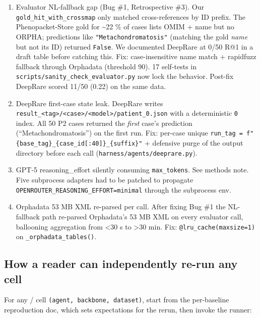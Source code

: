 \begin{enumerate}
\def\labelenumi{\arabic{enumi}.}
\item
  Evaluator NL-fallback gap (Bug \#1, Retrospective \#3). Our
  \texttt{gold\_hit\_with\_crossmap} only matched cross-references by ID prefix.
  The Phenopacket-Store gold for \textasciitilde22 \% of cases lists OMIM + name but
  no ORPHA; predictions like \texttt{"Metachondromatosis"} (matching the gold
  \emph{name} but not its ID) returned \texttt{False}. We documented DeepRare
  at 0/50 R@1 in a draft table before catching this. Fix:
  case-insensitive name match + rapidfuzz fallback through Orphadata
  (threshold 90). 17 self-tests in
  \texttt{scripts/sanity\_check\_evaluator.py} now lock the behavior. Post-fix
  DeepRare scored 11/50 (0.22) on the same data.
\item
  DeepRare first-case state leak. DeepRare writes
  \texttt{result\_\textless{}tag\textgreater{}/\textless{}case\textgreater{}/\textless{}model\textgreater{}/patient\_0.json} with a deterministic
  \texttt{0} index. All 50 P2 cases returned the \emph{first} case's prediction
  (``Metachondromatosis'') on the first run. Fix: per-case unique
  \texttt{run\_tag\ =\ f"\{base\_tag\}\_\{case\_id{[}:40{]}\}\_\{suffix\}"} + defensive
  purge of the output directory before each call
  (\texttt{harness/agents/deeprare.py}).
\item
  GPT-5 reasoning\_effort silently consuming \texttt{max\_tokens}. See
   methods note. Five subprocess adapters had to be patched
  to propagate \texttt{OPENROUTER\_REASONING\_EFFORT=minimal} through the
  subprocess env.
\item
  Orphadata 53 MB XML re-parsed per call. After fixing Bug \#1 the
  NL-fallback path re-parsed Orphadata's 53 MB XML on every
  evaluator call, ballooning aggregation from \textless30 s to \textgreater30 min. Fix:
  \texttt{@lru\_cache(maxsize=1)} on \texttt{\_orphadata\_tables()}.
\end{enumerate}

\subsection{How a reader can independently re-run any cell}\label{how-a-reader-can-independently-re-run-any-cell}

For any  /  cell \texttt{(agent,\ backbone,\ dataset)}, start from the
per-baseline reproduction doc, which sets expectations for the rerun,
then invoke the runner:

